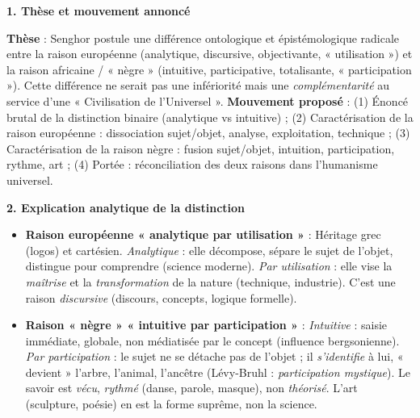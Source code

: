 \documentclass[11pt]{article}
\newcommand{\cle}[1]{{\popxbold\color{popdark}#1}}
\begin{document}
\begin{corrige}
\textbf{1. Thèse et mouvement annoncé}\par
\textbf{Thèse} : Senghor postule une \cle{différence ontologique et épistémologique} radicale entre la raison européenne (analytique, discursive, objectivante, « utilisation ») et la raison africaine / « nègre » (intuitive, participative, totalisante, « participation »). Cette différence ne serait pas une infériorité mais une \emph{complémentarité} au service d'une « Civilisation de l'Universel ».
\textbf{Mouvement proposé} : (1) Énoncé brutal de la distinction binaire (analytique vs intuitive) ; (2) Caractérisation de la raison européenne : dissociation sujet/objet, analyse, exploitation, technique ; (3) Caractérisation de la raison nègre : fusion sujet/objet, intuition, participation, rythme, art ; (4) Portée : réconciliation des deux raisons dans l'humanisme universel.

\textbf{2. Explication analytique de la distinction}\par
\begin{itemize}
\item \textbf{Raison européenne « analytique par utilisation »} : Héritage grec (logos) et cartésien. \emph{Analytique} : elle décompose, sépare le sujet de l'objet, distingue pour comprendre (science moderne). \emph{Par utilisation} : elle vise la \emph{maîtrise} et la \emph{transformation} de la nature (technique, industrie). C'est une raison \emph{discursive} (discours, concepts, logique formelle).
\item \textbf{Raison « nègre » « intuitive par participation »} : \emph{Intuitive} : saisie immédiate, globale, non médiatisée par le concept (influence bergsonienne). \emph{Par participation} : le sujet ne se détache pas de l'objet ; il \emph{s'identifie} à lui, « devient » l'arbre, l'animal, l'ancêtre (Lévy-Bruhl : \emph{participation mystique}). Le savoir est \emph{vécu}, \emph{rythmé} (danse, parole, masque), non \emph{théorisé}. L'art (sculpture, poésie) en est la forme suprême, non la science.
\end{itemize}


\end{corrige}
\end{document}
